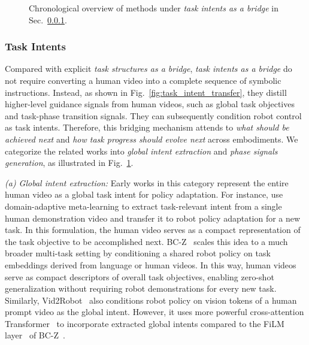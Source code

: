 \documentclass[Afour,sageh,times]{sagej}
\newcommand{\timelinecite}[1]{%
  \shortstack[c]{\citeauthor{#1}\\\citeyearpar{#1}}%
}
\begin{document}
\begin{figure}[t]
{%
  }
  \caption{Chronological overview of methods under \textit{task intents as a bridge} in Sec.~\ref{sec:task_intents}.}
  \label{fig:task_intent_timeline}
\end{figure}



\subsubsection{Task Intents} \label{sec:task_intents}

Compared with explicit \textit{task structures as a bridge}, \textit{task intents as a bridge} do not require converting a human video into a complete sequence of symbolic instructions. Instead, as shown in Fig.~\ref{fig:task_intent_transfer}, they distill higher-level guidance signals from human videos, such as global task objectives and task-phase transition signals. They can subsequently condition robot control as task intents. Therefore, this bridging mechanism attends to \textit{what should be achieved next} and \textit{how task progress should evolve next} across embodiments. We categorize the related works into \textit{global intent extraction} and \textit{phase signals generation}, as illustrated in Fig.~\ref{fig:task_intent_timeline}.

\textit{(a) Global intent extraction:} Early works in this category represent the entire human video as a global task intent for policy adaptation. For instance, \cite{yu2018one} use domain-adaptive meta-learning to extract task-relevant intent from a single human demonstration video and transfer it to robot policy adaptation for a new task. In this formulation, the human video serves as a compact representation of the task objective to be accomplished next. BC-Z~\citep{jang2022bc} scales this idea to a much broader multi-task setting by conditioning a shared robot policy on task embeddings derived from language or human videos. In this way, human videos serve as compact descriptors of overall task objectives, enabling zero-shot generalization without requiring robot demonstrations for every new task. Similarly, Vid2Robot~\citep{jain2024vid2robot} also conditions robot policy on vision tokens of a human prompt video as the global intent. However, it uses more powerful cross-attention Transformer~\citep{vaswani2017attention} to incorporate extracted global intents compared to the FiLM layer~\citep{perez2018film} of BC-Z~\citep{jang2022bc}.
\end{document}
